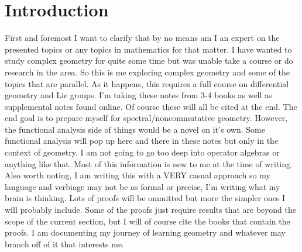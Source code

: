 \thispagestyle{empty}
\section*{Introduction}
First and foremost I want to clarify that by no means am I an expert on the presented
topics or any topics in mathematics for that matter. I have wanted to study complex
geometry for quite some time but was unable take a course or do research in the area.
So this is me exploring complex geometry and some of the topics that are parallel.
As it happens, this requires a full course on differential geometry and Lie groups.
I'm taking these notes from 3-4 books as well as supplemental notes found online.
Of course these will all be cited at the end. The end goal is to prepare myself for
spectral/noncommutative geometry. However, the functional analysis side of things
would be a novel on it's own. Some functional analysis will pop up here and there
in these notes but only in the context of geometry. I am not going to go too deep
into operator algebras or anything like that. Most of this information is new to
me at the time of writing. Also worth noting, I am writing this with a VERY casual
approach so my language and verbiage may not be as formal or precise, I'm writing
what my brain is thinking. Lots of proofs will be ommitted but more the simpler ones
I will probably include. Some of the proofs just require results that are beyond
the scope of the current section, but I will of course cite the books that contain
the proofs. I am documenting my journey of learning geometry and whatever may branch
off of it that interests me.
